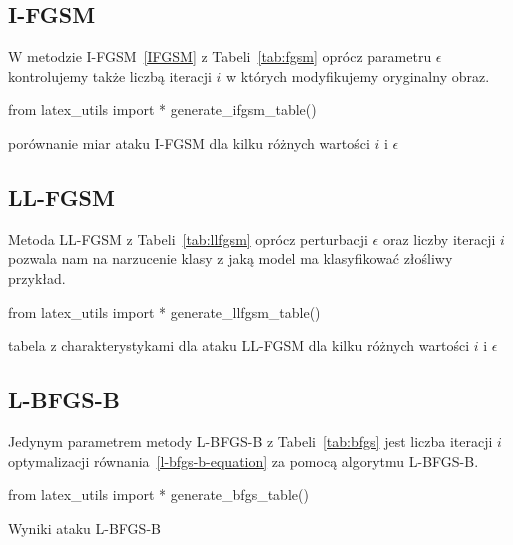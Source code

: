 \documentclass[
    left=2.5cm,         %
    right=2.5cm,        %
    top=2.5cm,          %
    bottom=3cm,         %
    bindingoffset=6mm,  %
    nohyphenation=false %
]{eiti/eiti-thesis}
\begin{document}
\subsection{I-FGSM}\label{I-FGSM-SCORES}
W metodzie I-FGSM~\ref{IFGSM} z Tabeli~\ref{tab:fgsm} oprócz parametru \(\epsilon\) kontrolujemy także liczbą iteracji \(i\) w których modyfikujemy
oryginalny obraz.
\begin{table}[H]
\begin{adjustbox}{max width=\textwidth}
\begin{pycode}
from latex_utils import *
generate_ifgsm_table()
\end{pycode}
\end{adjustbox}
\caption{porównanie miar ataku I-FGSM dla kilku różnych wartości \(i\) i \(\epsilon\)}
\label{tab:fgsm}
\end{table}
\newpage

\subsection{LL-FGSM}\label{LL-FGSM-SCORES}
Metoda LL-FGSM z Tabeli~\ref{tab:llfgsm} oprócz perturbacji \(\epsilon\) oraz liczby iteracji \(i\) pozwala nam na narzucenie klasy z jaką model
ma klasyfikować złośliwy przykład.
\begin{table}[H]
\begin{adjustbox}{max width=\textwidth}
\begin{pycode}
from latex_utils import *
generate_llfgsm_table()
\end{pycode}
\end{adjustbox}
\caption{tabela z charakterystykami dla ataku LL-FGSM dla kilku różnych wartości \(i\) i \(\epsilon\)}
\label{tab:llfgsm}
\end{table}

\subsection{L-BFGS-B}
Jedynym parametrem metody L-BFGS-B z Tabeli~\ref{tab:bfgs} jest liczba iteracji $i$ optymalizacji równania~\eqref{l-bfgs-b-equation}
za pomocą algorytmu L-BFGS-B.
\begin{table}[H]
\begin{adjustbox}{max width=\textwidth}
\begin{pycode}
from latex_utils import *
generate_bfgs_table()
\end{pycode}
\end{adjustbox}
\caption{Wyniki ataku L-BFGS-B}
\label{tab:bfgs}
\end{table}
\end{document}
